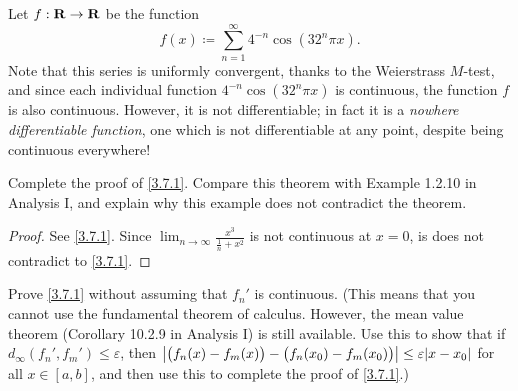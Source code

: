 \begin{example}\label{3.7.4}
  Let \(f : \mathbf{R} \to \mathbf{R}\) be the function
  \[
    f(x) \coloneqq \sum_{n = 1}^\infty 4^{-n} \cos(32^n \pi x).
  \]
  Note that this series is uniformly convergent, thanks to the Weierstrass \(M\)-test, and since each individual function \(4^{-n} \cos(32^n \pi x)\) is continuous, the function \(f\) is also continuous.
  However, it is not differentiable;
  in fact it is a \emph{nowhere differentiable function}, one which is not differentiable at any point, despite being continuous everywhere!
\end{example}

\exercisesection

\begin{exercise}\label{ex 3.7.1}
  Complete the proof of \cref{3.7.1}.
  Compare this theorem with Example 1.2.10 in Analysis I, and explain why this example does not contradict the theorem.
\end{exercise}

\begin{proof}
  See \cref{3.7.1}.
  Since \(\lim_{n \to \infty} \frac{x^3}{\frac{1}{n} + x^2}\) is not continuous at \(x = 0\), is does not contradict to \cref{3.7.1}.
\end{proof}

\begin{exercise}\label{ex 3.7.2}
  Prove \cref{3.7.1} without assuming that \(f_n'\) is continuous.
  (This means that you cannot use the fundamental theorem of calculus.
  However, the mean value theorem (Corollary 10.2.9 in Analysis I) is still available.
  Use this to show that if \(d_\infty(f_n', f_m') \leq \varepsilon\), then \(\abs{\big(f_n(x) - f_m(x)\big) - \big(f_n(x_0) - f_m(x_0)\big)} \leq \varepsilon \abs{x - x_0}\) for all \(x \in [a, b]\), and then use this to complete the proof of \cref{3.7.1}.)
\end{exercise}

